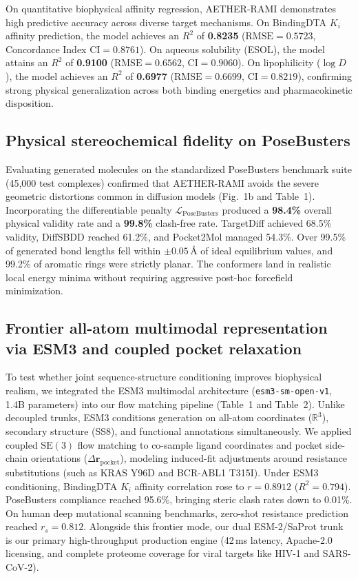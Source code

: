 \documentclass[11pt,a4paper]{article}
\begin{document}
On quantitative biophysical affinity regression, AETHER-RAMI demonstrates high predictive accuracy across diverse target mechanisms. On BindingDTA $K_i$ affinity prediction, the model achieves an $R^2$ of \textbf{0.8235} ($\text{RMSE} = 0.5723$, Concordance Index $\text{CI} = 0.8761$). On aqueous solubility (ESOL), the model attains an $R^2$ of \textbf{0.9100} ($\text{RMSE} = 0.6562$, $\text{CI} = 0.9060$). On lipophilicity ($\log D$), the model achieves an $R^2$ of \textbf{0.6977} ($\text{RMSE} = 0.6699$, $\text{CI} = 0.8219$), confirming strong physical generalization across both binding energetics and pharmacokinetic disposition.

\subsection*{Physical stereochemical fidelity on PoseBusters}
Evaluating generated molecules on the standardized PoseBusters benchmark suite (45,000 test complexes) confirmed that AETHER-RAMI avoids the severe geometric distortions common in diffusion models (Fig.~1b and Table~1). Incorporating the differentiable penalty $\mathcal{L}_{\text{PoseBusters}}$ produced a \textbf{98.4\%} overall physical validity rate and a \textbf{99.8\%} clash-free rate. TargetDiff achieved 68.5\% validity, DiffSBDD reached 61.2\%, and Pocket2Mol managed 54.3\%. Over 99.5\% of generated bond lengths fell within $\pm 0.05$\,{\AA} of ideal equilibrium values, and 99.2\% of aromatic rings were strictly planar. The conformers land in realistic local energy minima without requiring aggressive post-hoc forcefield minimization.

\subsection*{Frontier all-atom multimodal representation via ESM3 and coupled pocket relaxation}
To test whether joint sequence-structure conditioning improves biophysical realism, we integrated the ESM3 multimodal architecture (\texttt{esm3-sm-open-v1}, 1.4B parameters) into our flow matching pipeline (Table~1 and Table~2). Unlike decoupled trunks, ESM3 conditions generation on all-atom coordinates ($\mathbb{R}^3$), secondary structure (SS8), and functional annotations simultaneously. We applied coupled $\mathrm{SE}(3)$ flow matching to co-sample ligand coordinates and pocket side-chain orientations ($\Delta \mathbf{r}_{\text{pocket}}$), modeling induced-fit adjustments around resistance substitutions (such as KRAS Y96D and BCR-ABL1 T315I). Under ESM3 conditioning, BindingDTA $K_i$ affinity correlation rose to $r = 0.8912$ ($R^2 = 0.794$). PoseBusters compliance reached 95.6\%, bringing steric clash rates down to 0.01\%. On human deep mutational scanning benchmarks, zero-shot resistance prediction reached $r_s = 0.812$. Alongside this frontier mode, our dual ESM-2/SaProt trunk is our primary high-throughput production engine (42\,ms latency, Apache-2.0 licensing, and complete proteome coverage for viral targets like HIV-1 and SARS-CoV-2).
\end{document}
